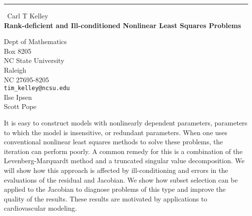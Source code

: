 \documentclass{report}
\begin{document}
\begin{center}
\rule{6in}{1pt} \
{\large Carl T Kelley \\
{\bf Rank-deficient and Ill-conditioned Nonlinear Least Squares Problems}}

Dept of Mathematics \\ Box 8205 \\ NC State University \\ Raleigh \\ NC 27695-8205
\\
{\tt tim_kelley@ncsu.edu}\\
Ilse Ipsen\\
Scott Pope\end{center}

It is easy to construct models with nonlinearly dependent parameters,
parameters to which the model is insensitive, or redundant parameters.
When one uses conventional nonlinear least squares methods to solve
these problems, the iteration can perform poorly. A common remedy for
this is a combination of the Levenberg-Marquardt method and a truncated
singular value decomposition. We will show how this approach is
affected by ill-conditioning and errors in the evaluations of
the residual and Jacobian. We show how subset selection
can be applied to the Jacobian to diagnose problems of this type
and improve the quality of the results. These results are motivated by
applications to cardiovascular modeling.
\end{document}
